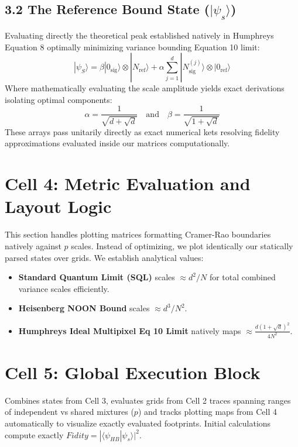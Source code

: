 \documentclass[12pt]{article}
\begin{document}
\subsection*{3.2 The Reference Bound State ($|\psi_s\rangle$)}
Evaluating directly the theoretical peak established natively in Humphreys Equation 8 optimally minimizing variance bounding Equation 10 limit:
\begin{equation}
    |\psi_S\rangle = \beta|0_{\text{sig}}\rangle \otimes |N_{\text{ref}}\rangle + \alpha \sum_{j=1}^d |N^{(j)}_{\text{sig}}\rangle \otimes |0_{\text{ref}}\rangle
\end{equation}
Where mathematically evaluating the scale amplitude yields exact derivations isolating optimal components:
\begin{equation}
    \alpha = \frac{1}{\sqrt{d+\sqrt{d}}} \quad \text{and} \quad \beta = \frac{1}{\sqrt{1+\sqrt{d}}}
\end{equation}
These arrays pass unitarily directly as exact numerical kets resolving fidelity approximations evaluated inside our matrices computationally.

\section*{Cell 4: Metric Evaluation and Layout Logic}
This section handles plotting matrices formatting Cramer-Rao boundaries natively against $p$ scales. 
Instead of optimizing, we plot identically our statically parsed states over grids. 
We establish analytical values:
\begin{itemize}
    \item \textbf{Standard Quantum Limit (SQL)} scales $\approx d^2 / N$ for total combined variance scales efficiently.
    \item \textbf{Heisenberg NOON Bound} scales $\approx d^3 / N^2$. 
    \item \textbf{Humphreys Ideal Multipixel Eq 10 Limit} natively maps $\approx \frac{d(1+\sqrt{d})^2}{4N^2}$.
\end{itemize}

\section*{Cell 5: Global Execution Block}
Combines states from Cell 3, evaluates grids from Cell 2 traces spanning ranges of independent vs shared mixtures ($p$) and tracks plotting maps from Cell 4 automatically to visualize exactly evaluated footprints. Initial calculations compute exactly $Fidity = |\langle \psi_{HB} | \psi_{s} \rangle|^2 $.
\end{document}

